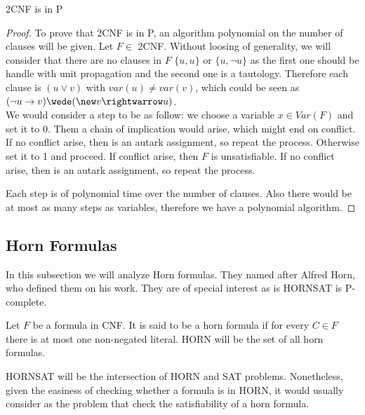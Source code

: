 \begin{proposition}
  2CNF is in P 
\end{proposition}
\begin{proof}

  To prove that 2CNF is in P, an algorithm polynomial on the number of clauses will be given. Let $F \in$ 2CNF.  Without loosing of generality, we will consider that there are no clauses in $F$ $\{u,u\}$ or $\{u,\neg u\}$ as the first one should be handle with unit propagation and the second one is a tautology. Therefore each clause is $(u \vee v)$ with $var(u) \ne var(v)$, which could be seen as $(\neg u \rightarrow v) \wede (\new v \rightwarrow u)$.\\


  
  We would consider a step to be as follow: we choose a variable $x \in Var(F)$ and set it to 0. Them a chain of implication would arise, which might end on conflict. If no conflict arise, then is an autark assignment, so repeat the process. Otherwise set it to 1 and proceed. If conflict arise, then $F$ is unsatisfiable. If no conflict arise, then is an autark assignment, so repeat the process.
  

  Each step is of polynomial time over the number of clauses. Also there would be at most as many steps as variables, therefore we have a polynomial algorithm.
  
  
\end{proof}

\subsection{Horn Formulas}

In this subsection we will analyze Horn formulas. They named after Alfred Horn, who defined them on his work\cite{horn1951sentences}. They are of special interest as is HORNSAT is P-complete.


\begin{definition}
  Let $F$ be a formula in CNF. It is said to be a horn formula if for every $C \in F$ there is at most one non-negated literal. HORN will be the set of all horn formulas.

  HORNSAT will be the intersection of HORN and SAT problems. Nonetheless, given the easiness of checking whether a formula is in HORN, it would usually consider as the problem that check the satisfiability of a horn formula.
\end{definition}


